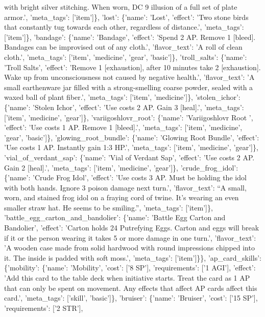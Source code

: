 \documentclass[
  letterpaper,
  DIV=11,
  numbers=noendperiod]{scrartcl}
\begin{document}
{with bright silver stitching. When worn, DC 9 illusion of a full set of
plate armor.', 'meta\_tags': {[}'item'{]}\}, 'lost': \{'name': 'Lost',
'effect': 'Two stone birds that constantly tug towards each other,
regardless of distance.', 'meta\_tags': {[}'item'{]}\}, 'bandage':
\{'name': 'Bandage', 'effect': 'Spend 2 AP. Remove 1 {[}bleed{]}.
Bandages can be improvised out of any cloth.', 'flavor\_text': 'A roll
of clean cloth.', 'meta\_tags': {[}'item', 'medicine', 'gear',
'basic'{]}\}, 'troll\_salts': \{'name': 'Troll Salts', 'effect': 'Remove
1 {[}exhaustion{]}, after 10 minutes take 2 {[}exhaustion{]}. Wake up
from unconsciousness not caused by negative health.', 'flavor\_text': 'A
small earthenware jar filled with a strong-smelling coarse powder,
sealed with a waxed ball of plant fiber.', 'meta\_tags': {[}'item',
'medicine'{]}\}, 'stolen\_ichor': \{'name': 'Stolen Ichor', 'effect':
'Use costs 2 AP. Gain 3 {[}heal{]}.', 'meta\_tags': {[}'item',
'medicine', 'gear'{]}\}, 'variigoshlovr\_root': \{'name': 'Variigoshlovr
Root ', 'effect': 'Use costs 1 AP. Remove 1 {[}bleed{]}.', 'meta\_tags':
{[}'item', 'medicine', 'gear', 'basic'{]}\}, 'glowing\_root\_bundle':
\{'name': 'Glowing Root Bundle', 'effect': 'Use costs 1 AP. Instantly
gain 1:3 HP.', 'meta\_tags': {[}'item', 'medicine', 'gear'{]}\},
'vial\_of\_verdant\_sap': \{'name': 'Vial of Verdant Sap', 'effect':
'Use costs 2 AP. Gain 2 {[}heal{]}.', 'meta\_tags': {[}'item',
'medicine', 'gear'{]}\}, 'crude\_frog\_idol': \{'name': 'Crude Frog
Idol', 'effect': 'Use costs 3 AP. Must be holding the idol with both
hands. Ignore 3 poison damage next turn.', 'flavor\_text': ``A small,
worn, and stained frog idol on a fraying cord of twine. It's wearing an
even smaller straw hat. He seems to be smiling.'', 'meta\_tags':
{[}'item'{]}\}, 'battle\_egg\_carton\_and\_bandolier': \{'name': 'Battle
Egg Carton and Bandolier', 'effect': 'Carton holds 24 Putrefying Eggs.
Carton and eggs will break if it or the person wearing it takes 5 or
more damage in one turn.', 'flavor\_text': 'A wooden case made from
solid hardwood with round impressions chipped into it. The inside is
padded with soft moss.', 'meta\_tags': {[}'item'{]}\}\},
'ap\_card\_skills': \{'mobility': \{'name': 'Mobility', 'cost': {[}'8
SP'{]}, 'requirements': {[}'1 AGI'{]}, 'effect': 'Add this card to the
table deck when initiative starts. Treat the card as 1 AP that can only
be spent on movement. Any effects that affect AP cards affect this
card.', 'meta\_tags': {[}'skill', 'basic'{]}\}, 'bruiser': \{'name':
'Bruiser', 'cost': {[}'15 SP'{]}, 'requirements': {[}'2 STR'{]},
}
\end{document}
